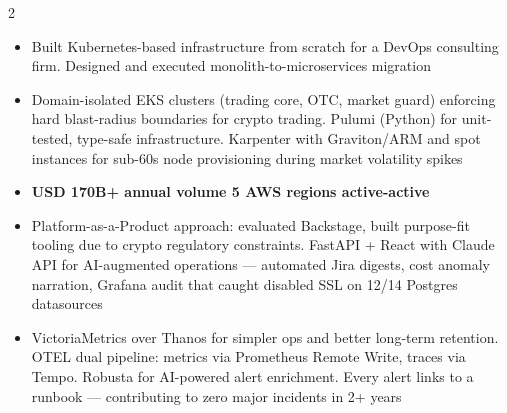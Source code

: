 \documentclass[10pt,a4paper,ragged2e,withhyper]{altacv}
\begin{document}
\begin{paracol}{2}
\begin{itemize}
\item Built Kubernetes-based infrastructure from scratch for a DevOps consulting firm. Designed and executed monolith-to-microservices migration
\end{itemize}

\divider



\begin{itemize}
\item Domain-isolated EKS clusters (trading core, OTC, market guard) enforcing hard blast-radius boundaries for crypto trading. Pulumi (Python) for unit-tested, type-safe infrastructure. Karpenter with Graviton/ARM and spot instances for sub-60s node provisioning during market volatility spikes
\item \textbf{USD 170B+ annual volume \textperiodcentered{} 5 AWS regions \textperiodcentered{} active-active}
\end{itemize}

\divider

\begin{itemize}
\item Platform-as-a-Product approach: evaluated Backstage, built purpose-fit tooling due to crypto regulatory constraints. FastAPI + React with Claude API for AI-augmented operations --- automated Jira digests, cost anomaly narration, Grafana audit that caught disabled SSL on 12/14 Postgres datasources
\end{itemize}

\divider

\begin{itemize}
\item VictoriaMetrics over Thanos for simpler ops and better long-term retention. OTEL dual pipeline: metrics via Prometheus Remote Write, traces via Tempo. Robusta for AI-powered alert enrichment. Every alert links to a runbook --- contributing to zero major incidents in 2+ years
\end{itemize}

\divider


\end{paracol}
\end{document}
